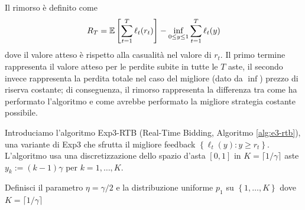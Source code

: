 Il rimorso è definito come
$$ R_T = \mathbb{E} \left[\sum_{t = 1}^T \ell_t (r_t)\right] - \inf_{0 \leq y \leq 1} \sum_{t = 1}^T \ell_t (y) $$
dove il valore atteso è rispetto alla casualità nel valore di $r_t$. Il primo termine rappresenta il valore atteso per le perdite subite in tutte le $T$ aste, il secondo invece rappresenta la perdita totale nel caso del migliore (dato da $\inf$) prezzo di riserva costante; di conseguenza, il rimorso rappresenta la differenza tra come ha performato l'algoritmo e come avrebbe performato la migliore strategia costante possibile.

Introduciamo l'algoritmo Exp3-RTB (Real-Time Bidding, Algoritmo \ref{alg:e3-rtb}), una variante di Exp3 che sfrutta il migliore feedback $\left\{\ell_t (y) : y \geq r_t \right\}$. L'algoritmo usa una discretizzazione dello spazio d'asta $[0,1]$ in $K = \lceil 1/\gamma \rceil$ aste $y_k := (k-1) \gamma$ per $k = 1, \dots, K$.

\begin{center}
    \begin{algorithm}
    	\label{alg:e3-rtb}
        \caption{Exp3-RTB}
        Definisci il parametro $\eta = \gamma/2$ e la distribuzione uniforme $p_1$ su $\left\{1, \dots, K\right\}$ dove $K = \lceil 1 / \gamma \rceil$\;
    \end{algorithm}
\end{center}

